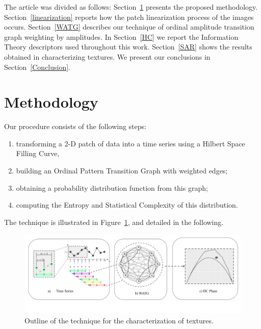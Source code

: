 \documentclass{isprs}
\begin{document}
	
	
	
	The article was divided as follows:
	Section~\ref{methodology} presents the proposed methodology.
	Section~\ref{linearization} reports how the patch linearization process of the images occurs.
	Section~\ref{WATG} describes our technique of ordinal amplitude transition graph weighting by amplitudes.
	In Section~\ref{HC} we report the Information Theory descriptors used throughout this work.
	Section~\ref{SAR} shows the results obtained in characterizing textures.
	We present our conclusions in Section~\ref{Conclusion}.
	
	
	\section{Methodology}\label{methodology}
	
	Our procedure consists of the following steps:
	\begin{enumerate}
		\item\label{item:Linearlize} transforming a 2-D patch of data into a time series using a Hilbert Space Filling Curve,
		\item\label{item:WOPTG} building an Ordinal Pattern Transition Graph with weighted edges;
		\item\label{item:Probability} obtaining a probability distribution function from this graph;
		\item\label{item:Descriptors} computing the Entropy and Statistical Complexity of this distribution.
	\end{enumerate}
	The technique is illustrated in Figure~\ref{fig:WATG}, and detailed in the following.
	
	
	\begin{figure}[hbt]
		\centering
		\includegraphics[scale = 0.32]{Figures/WATG.pdf}
		\caption{Outline of the technique for the characterization of textures.}
		\label{fig:WATG}
	\end{figure}
	
\end{document}

